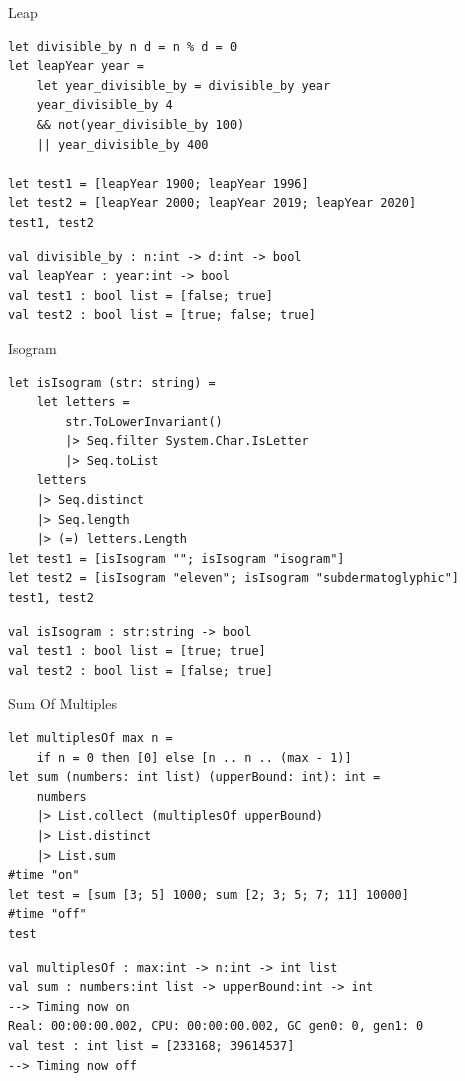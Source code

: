 \documentclass[t]{beamer}
\begin{document}
\begin{frame}[label={sec:org45a545a},fragile]{Leap}
 \begin{verbatim}
let divisible_by n d = n % d = 0
let leapYear year =
    let year_divisible_by = divisible_by year
    year_divisible_by 4
    && not(year_divisible_by 100) 
    || year_divisible_by 400

let test1 = [leapYear 1900; leapYear 1996]
let test2 = [leapYear 2000; leapYear 2019; leapYear 2020]
test1, test2
\end{verbatim}

\begin{verbatim}
val divisible_by : n:int -> d:int -> bool
val leapYear : year:int -> bool
val test1 : bool list = [false; true]
val test2 : bool list = [true; false; true]
\end{verbatim}
\end{frame}

\begin{frame}[label={sec:orgea0bd59},fragile]{Isogram}
 \begin{verbatim}
let isIsogram (str: string) =
    let letters =
        str.ToLowerInvariant()
        |> Seq.filter System.Char.IsLetter
        |> Seq.toList
    letters
    |> Seq.distinct
    |> Seq.length
    |> (=) letters.Length
let test1 = [isIsogram ""; isIsogram "isogram"]
let test2 = [isIsogram "eleven"; isIsogram "subdermatoglyphic"]
test1, test2
\end{verbatim}

\begin{verbatim}
val isIsogram : str:string -> bool
val test1 : bool list = [true; true]
val test2 : bool list = [false; true]
\end{verbatim}
\end{frame}

\begin{frame}[label={sec:org85c498c},fragile]{Sum Of Multiples}
 \begin{verbatim}
let multiplesOf max n =
    if n = 0 then [0] else [n .. n .. (max - 1)]
let sum (numbers: int list) (upperBound: int): int =
    numbers
    |> List.collect (multiplesOf upperBound)
    |> List.distinct
    |> List.sum
#time "on"
let test = [sum [3; 5] 1000; sum [2; 3; 5; 7; 11] 10000]
#time "off"
test
\end{verbatim}

\begin{verbatim}
val multiplesOf : max:int -> n:int -> int list
val sum : numbers:int list -> upperBound:int -> int
--> Timing now on
Real: 00:00:00.002, CPU: 00:00:00.002, GC gen0: 0, gen1: 0
val test : int list = [233168; 39614537]
--> Timing now off
\end{verbatim}
\end{frame}
\end{document}
